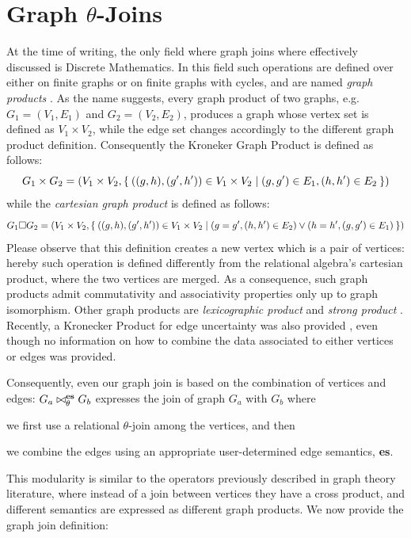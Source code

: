 \section{Graph $\theta$-Joins}\label{sec:grajoindef}
At the time of writing, the only field where graph joins where effectively
discussed is Discrete Mathematics. In this field such operations are defined
over either on finite graphs or on finite graphs with cycles, and are named
\textit{graph products} \cite{Hammack}. As the name suggests, every graph product of two graphs,
e.g. $G_1=(V_1,E_1)$ and $G_2=(V_2,E_2)$, produces a graph whose vertex set
is defined as $V_1\times V_2$, while the edge set changes accordingly to the
different graph product definition. Consequently the Kroneker Graph Product
\cite{Weichsel} is defined as follows:
\[G_1\times G_2=(V_1\times V_2, \Set{((g,h),(g',h'))\in V_1\times V_2|(g,g')\in E_1,(h,h')\in E_2})\]
while the \textit{cartesian graph product} \cite{ImrichP07} is defined as follows:
\[G_1\square G_2=(V_1\times V_2,\Set{((g,h),(g',h'))\in V_1\times V_2|(g=g',(h,h')\in E_2) \vee  (h=h', (g,g')\in E_1)})\]
Please observe that this definition creates a new vertex which is a pair of
vertices: hereby such operation is defined differently from the relational
algebra's cartesian product, where the two vertices are merged. As a consequence,
such graph products admit commutativity and associativity properties only up to
graph isomorphism. Other graph products are \textit{lexicographic product}
and \textit{strong product} \cite{Hammack,ProductGraphs}. Recently, a Kronecker Product for edge uncertainty was also provided \cite{Zhao17RH}, even though no information on how to combine the data associated to either vertices or edges was provided.

Consequently, even our graph join is based on
the combination of vertices and  edges: $G_a\bowtie_\theta^{\textup{\textbf{es}}}G_b$
expresses the join of graph $G_a$ with $G_b$ where
\begin{enumerate*}[label=\textit{(\roman*)}]
	\item we first use a relational $\theta$-join among the vertices,
	and then \item we combine the edges using an appropriate user-determined
	edge semantics, \textbf{es}.
\end{enumerate*}
This  modularity is similar to
the operators previously described in graph theory literature, where instead of a join between vertices they have a
cross product, and different semantics are expressed as different
graph products.
We now provide the graph join definition:


